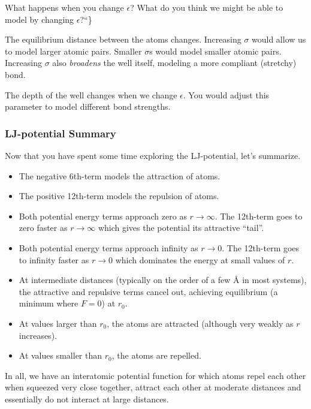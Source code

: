 \documentclass{book}
\providecommand{\tightlist}{%
  \setlength{\itemsep}{0pt}\setlength{\parskip}{0pt}}
\begin{document}
What happens when you change \(\epsilon\)? What do you think we might be able
to model by changing \(\epsilon\)?{}``\}

The equilibrium distance between the atoms changes. Increasing \(\sigma\)
would allow us to model larger atomic pairs. Smaller \(\sigma\)s would model
smaller atomic pairs. Increasing \(\sigma\) also \emph{broadens} the well
itself, modeling a more compliant (stretchy) bond.

The depth of the well changes when we change \(\epsilon\). You would adjust
this parameter to model different bond strengths.

\hypertarget{lj-potential-summary}{%
\subsubsection{LJ-potential Summary}\label{lj-potential-summary}}

Now that you have spent some time exploring the LJ-potential, let's summarize.

\begin{itemize}
\tightlist
\item
  The negative 6th-term models the attraction of atoms.
\item
  The positive 12th-term models the repulsion of atoms.
\item
  Both potential energy terms approach zero as \(r \rightarrow \infty\). The
  12th-term goes to zero faster as \(r \rightarrow \infty\) which gives the
  potential its attractive ``tail''.
\item
  Both potential energy terms approach infinity as \(r \rightarrow 0\). The
  12th-term goes to infinity faster as \(r \rightarrow 0\) which dominates the
  energy at small values of \(r\).
\item
  At intermediate distances (typically on the order of a few Å in most
  systems), the attractive and repulsive terms cancel out, achieving
  equilibrium (a minimum where \(F = 0\)) at \(r_0\).
\item
  At values larger than \(r_0\), the atoms are attracted (although very weakly
  as \(r\) increases).
\item
  At values smaller than \(r_0\), the atoms are repelled.
\end{itemize}

In all, we have an interatomic potential function for which atoms repel each
other when squeezed very close together, attract each other at moderate
distances and essentially do not interact at large distances.
\end{document}
